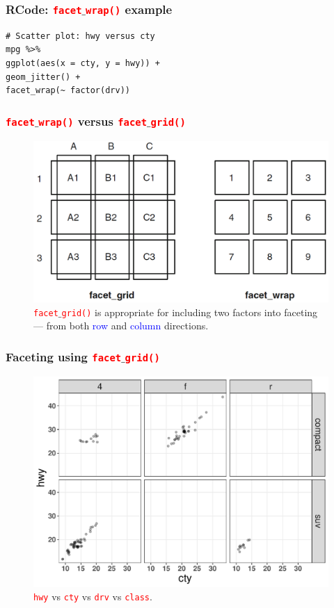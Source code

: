 \documentclass{beamer}
\begin{document}
\begin{frame}[fragile]\frametitle{RCode: \texttt{\textcolor{red}{facet}$\_$\textcolor{red}{wrap()}} example}
\lstset{basicstyle=\Large\ttfamily}
\begin{lstlisting}
# Scatter plot: hwy versus cty
mpg %>%
ggplot(aes(x = cty, y = hwy)) +
geom_jitter() +
facet_wrap(~ factor(drv))
\end{lstlisting}
\end{frame}

\begin{frame}\frametitle{\texttt{\textcolor{red}{facet}$\_$\textcolor{red}{wrap()}} versus \texttt{\textcolor{red}{facet}$\_$\textcolor{red}{grid()}}}
\begin{figure}
\includegraphics[width=0.99\linewidth]{PlotsLec2/FacettingInR}
\caption{{\small \texttt{\textcolor{red}{facet}$\_$\textcolor{red}{grid()}} is appropriate for including two factors into faceting --- from both \textcolor{blue}{row} and \textcolor{blue}{column} directions.}}
\end{figure}
\end{frame}

\begin{frame}\frametitle{Faceting using \texttt{\textcolor{red}{facet}$\_$\textcolor{red}{grid()}}}
\begin{figure}
\includegraphics[width=0.99\linewidth]{PlotsLec2/facet_grid_example}
\caption{{\small \texttt{\textcolor{red}{hwy}} vs \texttt{\textcolor{red}{cty}} vs \texttt{\textcolor{red}{drv}} vs \texttt{\textcolor{red}{class}}.}}
\end{figure}
\end{frame}
\end{document}
